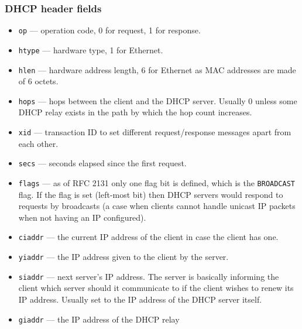\documentclass[pdftex,12pt,a4paper]{article}
\begin{document}
            \subsubsection{DHCP header fields}
                \begin{itemize}
                    \item \texttt{op} --- operation code, 0 for request,
                        1 for response.
                    \item \texttt{htype} --- hardware type, 1 for Ethernet.
                    \item \texttt{hlen} --- hardware address length, 6 for
                        Ethernet as MAC addresses are made of 6 octets.
                    \item \texttt{hops} --- hops between the client and
                        the DHCP server. Usually 0 unless some DHCP relay
                        exists in the path by which the hop count increases.
                    \item \texttt{xid} --- transaction ID to set
                        different request/response messages apart from each
                        other.
                    \item \texttt{secs} --- seconds elapsed since the first request.
                    \item \texttt{flags} --- as of RFC 2131 only one flag bit
                        is defined, which is the \texttt{BROADCAST} flag. If
                        the flag is set (left-most bit) then DHCP servers would
                        respond to requests by broadcasts (a case when clients
                        cannot handle unicast IP packets when not having an IP
                        configured).
                    \item \texttt{ciaddr} --- the current IP address of the
                        client in case the client has one.
                    \item \texttt{yiaddr} --- the IP address given to the
                        client by the server.
                    \item \texttt{siaddr} --- next server's IP address. The
                        server is basically informing the client which server
                        should it communicate to if the client wishes to renew
                        its IP address. Usually set to the IP address of the
                        DHCP server itself.
                    \item \texttt{giaddr} --- the IP address of the DHCP relay

\end{itemize}
\end{document}
